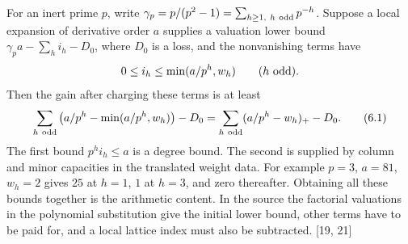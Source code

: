 \documentclass[11pt,letterpaper]{article}
\begin{document}
{For an inert prime $p$, write $\gamma_p=p/(p^2-1)=\sum_{h\ge1,\ h\ {\rm odd}}p^{-h}$. Suppose a local expansion of derivative order $a$ supplies a valuation lower bound $\gamma_p a-\sum_h i_h-D_0$, where $D_0$ is a loss, and the nonvanishing terms have
\begin{equation}\label{D:85}
 0\le i_h\le \min(a/p^h,w_h)\qquad (h\ {\rm odd}).
\end{equation}
Then the gain after charging these terms is at least
\begin{equation}\label{D:86}
 \sum_{h\ {\rm odd}}\left(a/p^h-\min(a/p^h,w_h)\right)-D_0
     =\sum_{h\ {\rm odd}}(a/p^h-w_h)_+-D_0.                      \tag{6.1}
\end{equation}
The first bound $p^hi_h\le a$ is a degree bound. The second is supplied by column and minor capacities in the translated weight data. For example $p=3$, $a=81$, $w_h=2$ gives $25$ at $h=1$, $1$ at $h=3$, and zero thereafter. Obtaining all these bounds together is the arithmetic content. In the source the factorial valuations in the polynomial substitution give the initial lower bound, other terms have to be paid for, and a local lattice index must also be subtracted. [19, 21]

}
\end{document}
